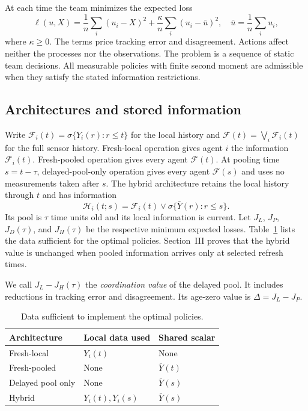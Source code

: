 \documentclass[letterpaper,10pt,conference]{ieeeconf}
\begin{document}
At each time the team minimizes the expected loss
\begin{equation}
 \ell(u,X)=\frac1n\sum_i(u_i-X)^2
       +\frac\kappa n\sum_i(u_i-\bar u)^2,
 \quad \bar u=\frac1n\sum_i u_i,\label{eq:loss}
\end{equation}
where $\kappa\ge0$. The terms price tracking error and disagreement. Actions affect neither the processes nor the observations. The problem is a sequence of static team decisions. All measurable policies with finite second moment are admissible when they satisfy the stated information restrictions.

\subsection{Architectures and stored information}
Write $\mathcal F_i(t)=\sigma\{Y_i(r):r\le t\}$ for the local history and $\mathcal F(t)=\bigvee_i\mathcal F_i(t)$ for the full sensor history. Fresh-local operation gives agent $i$ the information $\mathcal F_i(t)$. Fresh-pooled operation gives every agent $\mathcal F(t)$. At pooling time $s=t-\tau$, delayed-pool-only operation gives every agent $\mathcal F(s)$ and uses no measurements taken after $s$. The hybrid architecture retains the local history through $t$ and has information
\begin{equation}
 \mathcal H_i(t;s)=\mathcal F_i(t)\vee
             \sigma\{\bar Y(r):r\le s\}.\label{eq:hybrid}
\end{equation}
Its pool is $\tau$ time units old and its local information is current. Let $J_L$, $J_P$, $J_D(\tau)$, and $J_H(\tau)$ be the respective minimum expected losses. Table~\ref{tab:information} lists the data sufficient for the optimal policies. Section~III proves that the hybrid value is unchanged when pooled information arrives only at selected refresh times.

We call $J_L-J_H(\tau)$ the \emph{coordination value} of the delayed pool. It includes reductions in tracking error and disagreement. Its age-zero value is $\Delta=J_L-J_P$.

\begin{table}[t]
\caption{Data sufficient to implement the optimal policies.}
\label{tab:information}
\centering
\begin{tabular}{@{}lll@{}}
\toprule
Architecture & Local data used & Shared scalar \\
\midrule
Fresh-local & $Y_i(t)$ & None \\
Fresh-pooled & None & $\bar Y(t)$ \\
Delayed pool only & None & $\bar Y(s)$ \\
Hybrid & $Y_i(t),Y_i(s)$ & $\bar Y(s)$ \\
\bottomrule
\end{tabular}
\end{table}
\end{document}
